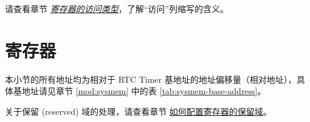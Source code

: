 \documentclass[main\_\_CN.tex]{subfiles}
\begin{document}
请查看章节 \hyperref[glossary-access-types]{\textit{寄存器的访问类型}}，了解“访问”列缩写的含义。





\newpage
\section{寄存器}

本小节的所有地址均为相对于 RTC Timer 基地址的地址偏移量（相对地址），具体基地址请见章节 \ref{mod:sysmem} \textit{} 中的表 \ref{tab:sysmem-base-address}。

关于保留 (reserved) 域的处理，请查看章节 \hyperref[programming-reserved-field]{如何配置寄存器的保留域}。



\end{document}
